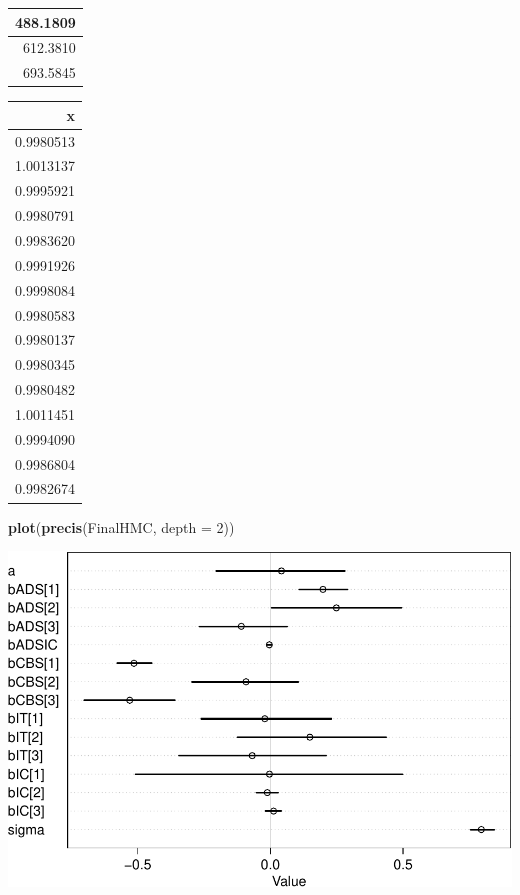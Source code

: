 \documentclass[10pt,dvipsnames,enabledeprecatedfontcommands]{scrartcl}
\newenvironment{Shaded}{\begin{snugshade}}{\end{snugshade}}
\newcommand{\KeywordTok}[1]{\textcolor[rgb]{0.13,0.29,0.53}{\textbf{#1}}}
\newcommand{\DataTypeTok}[1]{\textcolor[rgb]{0.13,0.29,0.53}{#1}}
\newcommand{\DecValTok}[1]{\textcolor[rgb]{0.00,0.00,0.81}{#1}}
\newcommand{\NormalTok}[1]{#1}
\begin{document}
\begin{table}
\begin{tabular}[t]{r}
\hline
488.1809\\
\hline
612.3810\\
\hline
693.5845\\
\hline
\end{tabular}
\centering
\begin{tabular}[t]{r}
\hline
x\\
\hline
0.9980513\\
\hline
1.0013137\\
\hline
0.9995921\\
\hline
0.9980791\\
\hline
0.9983620\\
\hline
0.9991926\\
\hline
0.9998084\\
\hline
0.9980583\\
\hline
0.9980137\\
\hline
0.9980345\\
\hline
0.9980482\\
\hline
1.0011451\\
\hline
0.9994090\\
\hline
0.9986804\\
\hline
0.9982674\\
\hline
\end{tabular}
\end{table}

\begin{Shaded}
\begin{Highlighting}[]
\KeywordTok{plot}\NormalTok{(}\KeywordTok{precis}\NormalTok{(FinalHMC, }\DataTypeTok{depth =} \DecValTok{2}\NormalTok{))}
\end{Highlighting}
\end{Shaded}

\begin{center}\includegraphics[width=1\linewidth]{bayesianReport_files/figure-latex/unnamed-chunk-13-1} \end{center}
\end{document}
